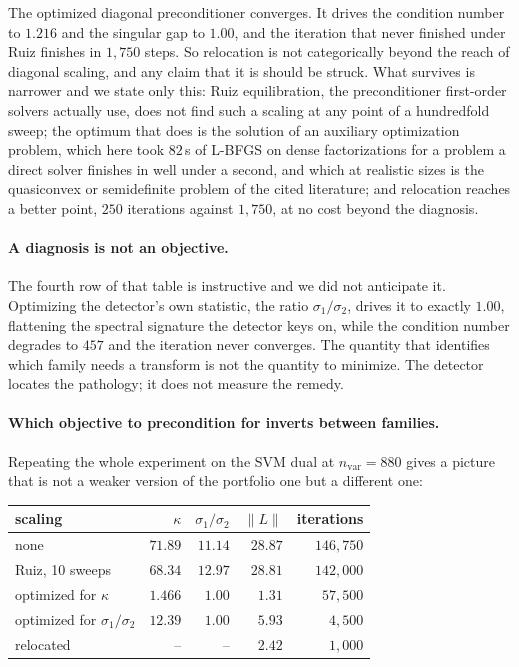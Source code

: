 \documentclass[11pt]{article}
\begin{document}
The optimized diagonal preconditioner converges. It drives the condition
number to $1.216$ and the singular gap to $1.00$, and the iteration that
never finished under Ruiz finishes in $1{,}750$ steps. So relocation is not
categorically beyond the reach of diagonal scaling, and any claim that it is
should be struck. What survives is narrower and we state only this: Ruiz
equilibration, the preconditioner first-order solvers actually use, does not
find such a scaling at any point of a hundredfold sweep; the optimum that
does is the solution of an auxiliary optimization problem, which here took
$82$\,s of L-BFGS on dense factorizations for a problem a direct solver
finishes in well under a second, and which at realistic sizes is the
quasiconvex or semidefinite problem of the cited literature; and relocation
reaches a better point, $250$ iterations against $1{,}750$, at no cost beyond
the diagnosis.

\paragraph{A diagnosis is not an objective.}
The fourth row of that table is instructive and we did not anticipate it.
Optimizing the detector's own statistic, the ratio $\sigma_1/\sigma_2$,
drives it to exactly $1.00$, flattening the spectral signature the detector
keys on, while the condition number degrades to $457$ and the iteration never
converges. The quantity that identifies which family needs a transform is not
the quantity to minimize. The detector locates the pathology; it does not
measure the remedy.

\paragraph{Which objective to precondition for inverts between families.}
Repeating the whole experiment on the SVM dual at $n_{\mathrm{var}} = 880$
gives a picture that is not a weaker version of the portfolio one but a
different one:

\begin{center}
\begin{tabular}{lrrrr}
\toprule
scaling & $\kappa$ & $\sigma_1/\sigma_2$ & $\|L\|$ & iterations \\
\midrule
none                       & $71.89$ & $11.14$ & $28.87$ & $146{,}750$ \\
Ruiz, 10 sweeps            & $68.34$ & $12.97$ & $28.81$ & $142{,}000$ \\
optimized for $\kappa$      & $1.466$ & $1.00$  & $1.31$  & $57{,}500$ \\
optimized for $\sigma_1/\sigma_2$ & $12.39$ & $1.00$ & $5.93$ & $4{,}500$ \\
relocated                  & --      & --      & $2.42$  & $1{,}000$ \\
\bottomrule
\end{tabular}
\end{center}
\end{document}
